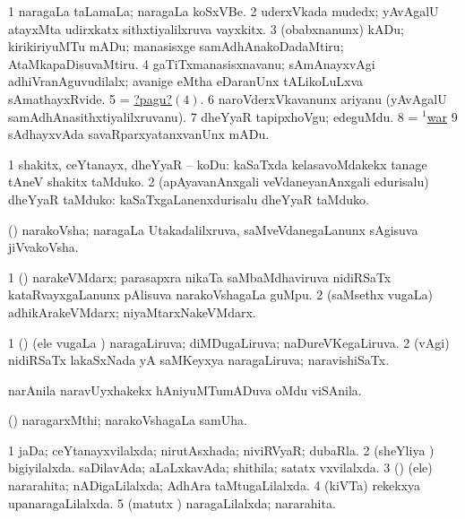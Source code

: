 \noindent
\gl{\pagu}
\bmng
\bnum
\num{1}  naragaLa taLamaLa; naragaLa koSxVBe. 
\num{2}  uderxVkada mudedx; yAvAgalU atayxMta udirxkatx sithxtiyalilxruva vayxkitx. 
\num{3} (obabxnanunx) kADu; kirikiriyuMTu mADu; manasisxge samAdhAnakoDadaMtiru; AtaMkapaDisuvaMtiru. 
\hypertarget{nerves pagu4}{} 
\num{4}  gaTiTxmanasisxnavanu; sAmAnayxvAgi adhiVranAguvudilalx; avanige eMtha eDaranUnx tALikoLuLxva sAmathayxRvide. 
\num{5}  = \hyperlink{nerves pagu4}{?pagu?\((4)\)}. 
\num{6}  naroVderxVkavanunx ariyanu (yAvAgalU samAdhAnasithxtiyalilxruvanu). 
\num{7}  dheYyaR tapipxhoVgu; edeguMdu. 
\num{8}  = \hyperref{kandict_w.pdf}{W}{war(1) pagu(19)}{$^1$war}  
\num{9}  sAdhayxvAda savaRparxyatanxvanUnx mADu. 
\enum
\emng
\eentry

\bentry
{}
\gl{\sakirx}
\bmng
\bnum
\num{1} shakitx, ceYtanayx, dheYyaR -- koDu:  kaSaTxda kelasavoMdakekx tanage tAneV shakitx taMduko. 
\num{2} (apAyavanAnxgali veVdaneyanAnxgali edurisalu) dheYyaR taMduko:  kaSaTxgaLanenxdurisalu dheYyaR taMduko. 
\enum
\emng
\eentry

\bentry
{}
\gl{\nA}
\bmng
(\pArxvi) narakoVsha; naragaLa Utakadalilxruva, saMveVdanegaLanunx sAgisuva jiVvakoVsha. 
\emng
\eentry

\bentry
{}
\gl{\nA}
\bmng
\bnum
\num{1} (\pArxvi) narakeVMdarx; parasapxra nikaTa saMbaMdhaviruva nidiRSaTx kataRvayxgaLanunx pAlisuva narakoVshagaLa guMpu. 
\num{2} (saMsethx \mo vugaLa) adhikArakeVMdarx; niyaMtarxNakeVMdarx. 
\enum
\emng
\eentry

\bentry
{}
\gl{\gu}
\bmng
\bnum
\num{1} (\savi) (ele \mo vugaLa \vi) naragaLiruva; diMDugaLiruva; naDureVKegaLiruva. 
\num{2} (\saupa vAgi) nidiRSaTx lakaSxNada yA saMKeyxya naragaLiruva; naravishiSaTx. 
\enum
\emng
\eentry

\bentry
{}
\gl{\nA}
\bmng
narAnila naravUyxhakekx hAniyuMTumADuva oMdu viSAnila. 
\emng
\eentry

\bentry
{}
\bmng
(\pArxparx) naragarxMthi; narakoVshagaLa samUha. 
\emng
\eentry

\bentry
{}
\gl{\gu}
\bmng
\bnum
\num{1} jaDa; ceYtanayxvilalxda; nirutAsxhada; niviRVyaR; dubaRla. 
\num{2} (sheYliya \vi) bigiyilalxda. saDilavAda; aLaLxkavAda; shithila; satatx vxvilalxda. 
\num{3} (\savi) (ele) nararahita; nADigaLilalxda; AdhAra taMtugaLilalxda. 
\num{4} (kiVTa) rekekxya upanaragaLilalxda. 
\num{5} (\aMrashA matutx \pArxvi) naragaLilalxda; nararahita. 
\enum
\emng
\eentry

